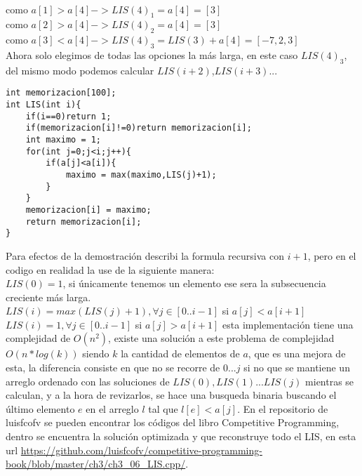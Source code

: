 \\como $a[1] > a[4] -> LIS(4)_1 = a[4] = [3]$
\\como $a[2] > a[4] -> LIS(4)_2 = a[4] = [3]$
\\como $a[3] < a[4] -> LIS(4)_3 = LIS(3) + a[4] = [-7,2,3]$
\\Ahora solo elegimos de todas las opciones la más larga, en este caso $LIS(4)_3$, del mismo modo podemos calcular $LIS(i+2)$,$LIS(i+3)$... 
\\\begin{minipage}{\textwidth}
\begin{lstlisting}[style=C,caption=LIS.cpp]
int memorizacion[100];
int LIS(int i){
    if(i==0)return 1;
    if(memorizacion[i]!=0)return memorizacion[i];
    int maximo = 1;
    for(int j=0;j<i;j++){
        if(a[j]<a[i]){
            maximo = max(maximo,LIS(j)+1);
        }
    }
    memorizacion[i] = maximo;
    return memorizacion[i];
}
\end{lstlisting}
\end{minipage}
Para efectos de la demostración describi la formula recursiva con $i+1$, pero en el codigo en realidad la use de la siguiente manera:
\\$LIS(0) = 1$, si únicamente tenemos un elemento ese sera la subsecuencia creciente más larga.
\\$LIS(i) = max(LIS(j)+1), \forall j \in [0..i-1]$ si $a[j]<a[i+1]$
\\$LIS(i) = 1, \forall j \in [0..i-1]$ si $a[j]>a[i+1]$
esta implementación tiene una complejidad de $O(n^2)$, existe una solución a este problema de complejidad $O(n*log(k))$ siendo $k$ la cantidad de elementos de $a$, que es una mejora de esta, la diferencia consiste en que no se recorre de $0...j$ si no que se mantiene un arreglo ordenado con las soluciones de $LIS(0),LIS(1)...LIS(j)$ mientras se calculan, y a la hora de revizarlos, se hace una busqueda binaria buscando el último elemento $e$ en el arreglo $l$ tal que $l[e] < a[j]$. En el repositorio de luisfcofv se pueden encontrar los códigos del libro Competitive Programming, dentro se encuentra la solución optimizada y que reconstruye todo el LIS, en esta url \url{https://github.com/luisfcofv/competitive-programming-book/blob/master/ch3/ch3_06_LIS.cpp/}.